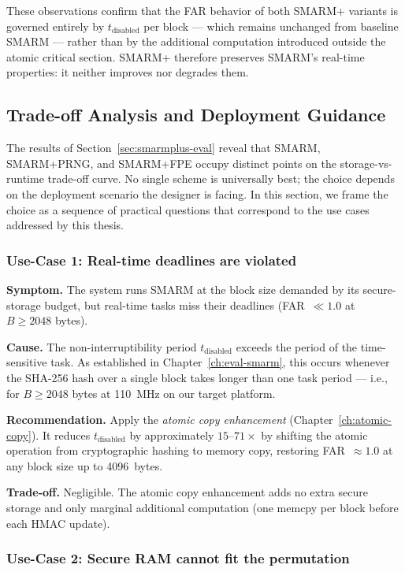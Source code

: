 \documentclass[a4paper,10pt]{article}
\begin{document}
{These observations confirm that the FAR behavior of both SMARM+ 
variants is governed entirely by $t_{\mathrm{disabled}}$ per 
block — which remains unchanged from baseline SMARM — rather than 
by the additional computation introduced outside the atomic 
critical section. SMARM+ therefore preserves SMARM's real-time 
properties: it neither improves nor degrades them.

\subsection{Trade-off Analysis and Deployment Guidance}
\label{sec:smarmplus-deployment}

The results of Section~\ref{sec:smarmplus-eval} reveal that 
SMARM, SMARM+PRNG, and SMARM+FPE 
occupy distinct points on the storage-vs-runtime trade-off curve. 
No single scheme is universally best; the choice depends on the 
deployment scenario the designer is facing. In this section, we 
frame the choice as a sequence of practical questions that 
correspond to the use cases addressed by this thesis.

\subsubsection{Use-Case 1: Real-time deadlines are violated}

\textbf{Symptom.} The system runs SMARM at the block size 
demanded by its secure-storage budget, but real-time tasks 
miss their deadlines (FAR~$\ll 1.0$ at $B \geq 2048$ bytes).

\textbf{Cause.} The non-interruptibility period 
$t_{\mathrm{disabled}}$ exceeds the period of the time-sensitive 
task. As established in Chapter~\ref{ch:eval-smarm}, this occurs 
whenever the SHA-256 hash over a single block takes longer than 
one task period — i.e., for $B \geq 2048$ bytes at 110~MHz on 
our target platform.

\textbf{Recommendation.} Apply the \emph{atomic copy enhancement} 
(Chapter~\ref{ch:atomic-copy}). It reduces $t_{\mathrm{disabled}}$ 
by approximately $15$--$71\times$ by shifting the atomic 
operation from cryptographic hashing to memory copy, restoring 
FAR~$\approx 1.0$ at any block size up to 4096~bytes.

\textbf{Trade-off.} Negligible. The atomic copy enhancement adds 
no extra secure storage and only marginal additional computation 
(one memcpy per block before each HMAC update).

\subsubsection{Use-Case 2: Secure RAM cannot fit the permutation}

}
\end{document}
